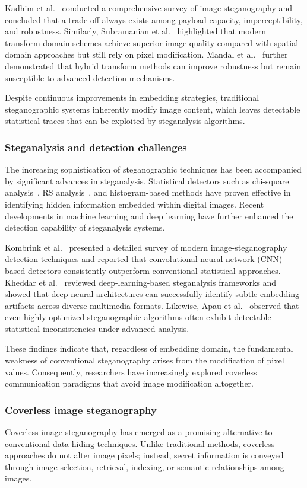 \documentclass[10pt,a4paper]{article}
\theoremstyle{definition}
\begin{document}
Kadhim et al.\ \cite{kadhim} conducted a comprehensive survey of image steganography and
concluded that a trade-off always exists among payload capacity, imperceptibility,
and robustness. Similarly, Subramanian et al.\ \cite{subramanian} highlighted that modern
transform-domain schemes achieve superior image quality compared with
spatial-domain approaches but still rely on pixel modification. Mandal et al.\ \cite{mandal}
further demonstrated that hybrid transform methods can improve robustness but remain
susceptible to advanced detection mechanisms.

Despite continuous improvements in embedding strategies, traditional steganographic
systems inherently modify image content, which leaves detectable statistical traces
that can be exploited by steganalysis algorithms.

\subsubsection{Steganalysis and detection challenges}
The increasing sophistication of steganographic techniques has been accompanied by
significant advances in steganalysis. Statistical detectors such as chi-square
analysis~\cite{westfeld1999}, RS analysis~\cite{fridrich2001}, and histogram-based methods have proven effective in
identifying hidden information embedded within digital images. Recent developments
in machine learning and deep learning have further enhanced the detection capability
of steganalysis systems.

Kombrink et al.\ \cite{kombrink} presented a detailed survey of modern image-steganography
detection techniques and reported that convolutional neural network (CNN)-based
detectors consistently outperform conventional statistical approaches. Kheddar
et al.\ \cite{kheddar} reviewed deep-learning-based steganalysis frameworks and showed that
deep neural architectures can successfully identify subtle embedding artifacts
across diverse multimedia formats. Likewise, Apau et al.\ \cite{apau} observed that even
highly optimized steganographic algorithms often exhibit detectable statistical
inconsistencies under advanced analysis.

These findings indicate that, regardless of embedding domain, the fundamental
weakness of conventional steganography arises from the modification of pixel values.
Consequently, researchers have increasingly explored coverless communication
paradigms that avoid image modification altogether.

\subsubsection{Coverless image steganography}
Coverless image steganography has emerged as a promising alternative to conventional
data-hiding techniques. Unlike traditional methods, coverless approaches do not
alter image pixels; instead, secret information is conveyed through image selection,
retrieval, indexing, or semantic relationships among images.
\end{document}
